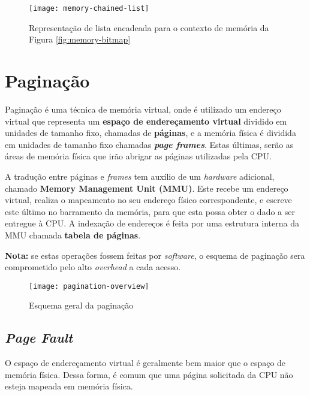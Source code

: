 \begin{figure}[h]
  \centering
  \texttt{[image: memory-chained-list]}
  \caption{Representação de lista encadeada para o contexto de memória da Figura \ref{fig:memory-bitmap}}
  \label{fig:memory-chained-list}
\end{figure}
















\section{Paginação}
Paginação é uma técnica de memória virtual, onde é utilizado um endereço virtual que representa um \textbf{espaço de endereçamento virtual} dividido em unidades de tamanho fixo, chamadas de \textbf{páginas}, e a memória física é dividida em unidades de tamanho fixo chamadas \textbf{\textit{page frames}}. Estas últimas, serão as áreas de memória física que irão abrigar as páginas utilizadas pela CPU.

A tradução entre páginas e \textit{frames} tem auxílio de um \textit{hardware} adicional, chamado \textbf{Memory Management Unit (MMU)}. Este recebe um endereço virtual, realiza o mapeamento no seu endereço físico correspondente, e escreve este último no barramento da memória, para que esta possa obter o dado a ser entregue à CPU. A indexação de endereços é feita por uma estrutura interna da MMU chamada \textbf{tabela de páginas}.

\textbf{Nota:} se estas operações fossem feitas por \textit{software}, o esquema de paginação sera comprometido pelo alto \textit{overhead} a cada acesso.

\begin{figure}[h]
  \centering
  \texttt{[image: pagination-overview]}
  \caption{Esquema geral da paginação}
  \label{fig:pagination}
\end{figure}










\subsection{\textit{Page Fault}}
O espaço de endereçamento virtual é geralmente bem maior que o espaço de memória física. Dessa forma, é comum que uma página solicitada da CPU não esteja mapeada em memória física.

